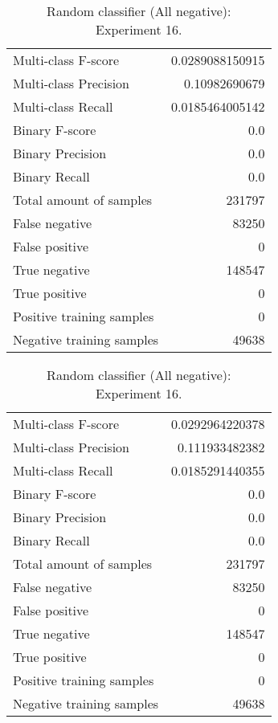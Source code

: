 \begin{table}[H]
\begin{minipage}{0.5\textwidth}
\caption{Random classifier (All negative): \\Experiment 15.}
\centering
\begin{tabular}{l r}
\toprule
Multi-class F-score & 0.0289088150915 \\
Multi-class Precision & 0.10982690679 \\
Multi-class Recall & 0.0185464005142 \\
\midrule
Binary F-score & 0.0 \\
Binary Precision & 0.0 \\
Binary Recall & 0.0 \\
\midrule
Total amount of samples & 231797 \\
False negative & 83250 \\
False positive & 0 \\
True negative & 148547 \\
True positive & 0 \\
\midrule
Positive training samples & 0 \\
Negative training samples & 49638 \\
\bottomrule
\end{tabular}
\end{minipage}
\hfillx
\begin{minipage}{0.5\textwidth}
\caption{Random classifier (All negative): \\Experiment 16.}
\centering
\begin{tabular}{l r}
\toprule
Multi-class F-score & 0.0292964220378 \\
Multi-class Precision & 0.111933482382 \\
Multi-class Recall & 0.0185291440355 \\
\midrule
Binary F-score & 0.0 \\
Binary Precision & 0.0 \\
Binary Recall & 0.0 \\
\midrule
Total amount of samples & 231797 \\
False negative & 83250 \\
False positive & 0 \\
True negative & 148547 \\
True positive & 0 \\
\midrule
Positive training samples & 0 \\
Negative training samples & 49638 \\
\bottomrule
\end{tabular}
\end{minipage}
\end{table}
